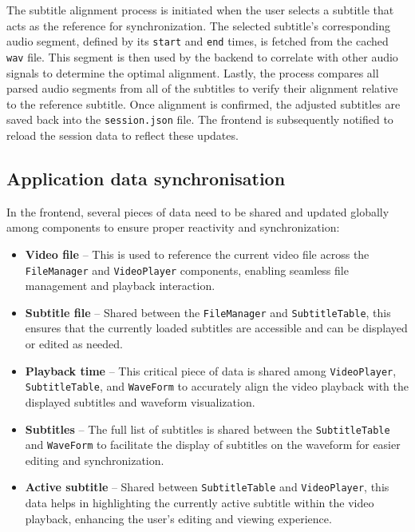 The subtitle alignment process is initiated when the user selects a subtitle that acts as the reference for synchronization. The selected subtitle's corresponding audio segment, defined by its \texttt{start} and \texttt{end} times, is fetched from the cached \texttt{wav} file. This segment is then used by the backend to correlate with other audio signals to determine the optimal alignment. Lastly, the process compares all parsed audio segments from all of the subtitles to verify their alignment relative to the reference subtitle. Once alignment is confirmed, the adjusted subtitles are saved back into the \texttt{session.json} file. The frontend is subsequently notified to reload the session data to reflect these updates.

\subsection{Application data synchronisation}

In the frontend, several pieces of data need to be shared and updated globally among components to ensure proper reactivity and synchronization:
\begin{itemize}
    \item \textbf{Video file} -- This is used to reference the current video file across the \texttt{FileManager} and \texttt{VideoPlayer} components, enabling seamless file management and playback interaction.
    \item \textbf{Subtitle file} -- Shared between the \texttt{FileManager} and \texttt{SubtitleTable}, this ensures that the currently loaded subtitles are accessible and can be displayed or edited as needed.
    \item \textbf{Playback time} -- This critical piece of data is shared among \texttt{VideoPlayer}, \texttt{SubtitleTable}, and \texttt{WaveForm} to accurately align the video playback with the displayed subtitles and waveform visualization.
    \item \textbf{Subtitles} -- The full list of subtitles is shared between the \texttt{SubtitleTable} and \texttt{WaveForm} to facilitate the display of subtitles on the waveform for easier editing and synchronization.
    \item \textbf{Active subtitle} -- Shared between \texttt{SubtitleTable} and \texttt{VideoPlayer}, this data helps in highlighting the currently active subtitle within the video playback, enhancing the user's editing and viewing experience.
\end{itemize}


